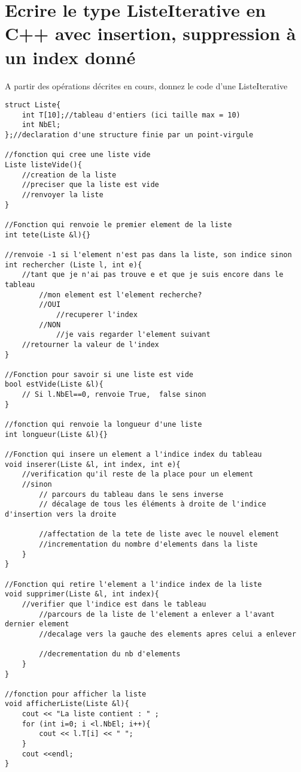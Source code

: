 \documentclass[french]{article}
\begin{document}
	\section{Ecrire le type ListeIterative en C++ avec insertion, suppression à un index donné}
	A partir des opérations décrites en cours, donnez le code d’une ListeIterative
	
	\begin{lstlisting}
struct Liste{
    int T[10];//tableau d'entiers (ici taille max = 10)
    int NbEl;
};//declaration d'une structure finie par un point-virgule

//fonction qui cree une liste vide 
Liste listeVide(){
    //creation de la liste
    //preciser que la liste est vide
    //renvoyer la liste
}

//Fonction qui renvoie le premier element de la liste
int tete(Liste &l){}

//renvoie -1 si l'element n'est pas dans la liste, son indice sinon
int rechercher (Liste l, int e){
    //tant que je n'ai pas trouve e et que je suis encore dans le tableau
        //mon element est l'element recherche?
 	   	//OUI
 	   	    //recuperer l'index
 	   	//NON
 	   	    //je vais regarder l'element suivant
    //retourner la valeur de l'index
}

//Fonction pour savoir si une liste est vide
bool estVide(Liste &l){
    // Si l.NbEl==0, renvoie True,  false sinon
}

//fonction qui renvoie la longueur d'une liste
int longueur(Liste &l){}

//Fonction qui insere un element a l'indice index du tableau
void inserer(Liste &l, int index, int e){
    //verification qu'il reste de la place pour un element
    //sinon
        // parcours du tableau dans le sens inverse 
        // décalage de tous les éléments à droite de l'indice d'insertion vers la droite
        
        //affectation de la tete de liste avec le nouvel element
        //incrementation du nombre d'elements dans la liste
    }
}

//Fonction qui retire l'element a l'indice index de la liste
void supprimer(Liste &l, int index){
    //verifier que l'indice est dans le tableau
        //parcours de la liste de l'element a enlever a l'avant dernier element
        //decalage vers la gauche des elements apres celui a enlever
          
        //decrementation du nb d'elements
    }
}

//fonction pour afficher la liste
void afficherListe(Liste &l){
    cout << "La liste contient : " ;
    for (int i=0; i <l.NbEl; i++){
        cout << l.T[i] << " ";
    }
    cout <<endl;
}
	\end{lstlisting}
	
\end{document}
